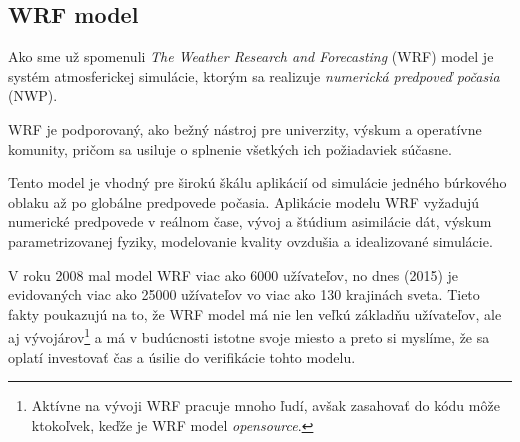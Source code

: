 

\subsection{WRF model}
\label{subsec:wrf}
Ako sme už spomenuli \textit{The Weather Research and Forecasting} (WRF) model je systém atmosferickej simulácie, ktorým sa realizuje \textit{numerická predpoveď počasia} (NWP).

WRF je podporovaný, ako bežný nástroj pre univerzity, výskum a operatívne komunity, pričom sa usiluje o splnenie všetkých ich požiadaviek súčasne.


Tento model je vhodný pre širokú škálu aplikácií od simulácie jedného búrkového oblaku až po globálne predpovede počasia. Aplikácie modelu WRF vyžadujú numerické predpovede v reálnom čase, vývoj a štúdium asimilácie dát, výskum parametrizovanej fyziky, modelovanie kvality ovzdušia a idealizované simulácie.

V roku 2008 mal model WRF viac ako 6000 užívateľov, no dnes (2015) je evidovaných viac ako 25000 užívateľov vo viac ako 130 krajinách sveta. Tieto fakty poukazujú na to, že WRF model má nie len veľkú základňu užívateľov, ale aj vývojárov\footnote{Aktívne na vývoji WRF pracuje mnoho ľudí, avšak zasahovať do kódu môže ktokoľvek, keďže je WRF model \textit{opensource}.} a má v budúcnosti istotne svoje miesto a preto si myslíme, že sa oplatí investovať čas a úsilie do verifikácie tohto modelu.

